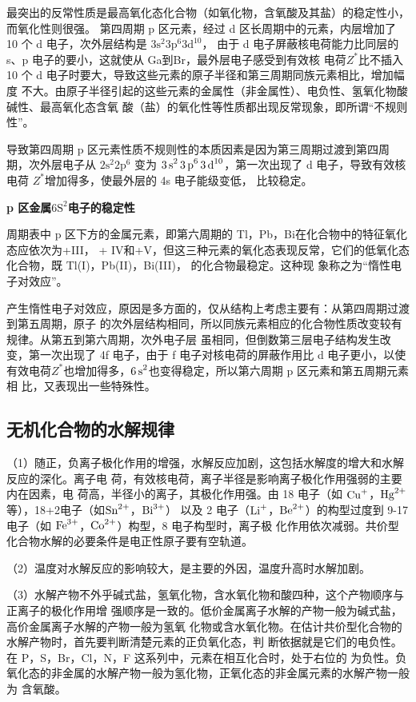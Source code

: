 \documentclass[
  10pt,
  twoside,
  openany,
  b5paper, %
  colorscheme = basic, %
  xits = false,
]{qyxf-book}
\begin{document}
最突出的反常性质是最高氧化态化合物（如氧化物，含氧酸及其盐）的稳定性小，而氧化性则很强。
第四周期 p 区元素，经过 d 区长周期中的元素，内层增加了 10 个 d 电子，次外层结构是 $\mathrm{3s^2 3p^6 3d^{10}}$，
由于 d 电子屏蔽核电荷能力比同层的 s、p 电子的要小，这就使从 Ga到Br，最外层电子感受到有效核
电荷$Z^\ast$比不插入 10 个 d 电子时要大，导致这些元素的原子半径和第三周期同族元素相比，增加幅度
不大。由原子半径引起的这些元素的金属性（非金属性）、电负性、氢氧化物酸碱性、最高氧化态含氧
酸（盐）的氧化性等性质都出现反常现象，即所谓“不规则性”。

导致第四周期 p 区元素性质不规则性的本质因素是因为第三周期过渡到第四周期，次外层电子从 $\mathrm{2s^2 2p^6}$
变为 $\ce{3s^2 3p^6 3d^{10}}$，第一次出现了 d 电子，导致有效核电荷 $Z^\ast$增加得多，使最外层的 4s 电子能级变低，
比较稳定。

\textbf{p 区金属$ \mathrm{6S^2}$电子的稳定性}

周期表中 p 区下方的金属元素，即第六周期的 Tl，Pb，Bi在化合物中的特征氧化态应依次为+III，
+ IV和+V，但这三种元素的氧化态表现反常，它们的低氧化态化合物，既 Tl(I)，Pb(II)，Bi(III)，
的化合物最稳定。这种现
象称之为“惰性电子对效应”。

产生惰性电子对效应，原因是多方面的，仅从结构上考虑主要有：从第四周期过渡到第五周期，原子
的次外层结构相同，所以同族元素相应的化合物性质改变较有规律。从第五到第六周期，次外电子层
虽相同，但倒数第三层电子结构发生改变，第一次出现了 4f 电子，由于 f 电子对核电荷的屏蔽作用比
d 电子更小，以使有效电荷$Z^\ast$也增加得多，$\ce{6s^2}$也变得稳定，所以第六周期 p 区元素和第五周期元素相
比，又表现出一些特殊性。

\subsection{无机化合物的水解规律}

（1）随正，负离子极化作用的增强，水解反应加剧，这包括水解度的增大和水解反应的深化。离子电
荷，有效核电荷，离子半径是影响离子极化作用强弱的主要内在因素，电
荷高，半径小的离子，其极化作用强。由 18 电子（如 $\ce{Cu+}$，$\ce{Hg^2+}$等），18+2电子（如$\ce{Sn^2+}$，$\ce{Bi^3+}$）
以及 2 电子（$\ce{Li+}$，$\ce{Be^2+}$）的构型过度到 9-17 电子（如 $\ce{Fe^3+}$，$\ce{Co^2+}$）构型，8 电子构型时，离子极
化作用依次减弱。共价型化合物水解的必要条件是电正性原子要有空轨道。

（2）温度对水解反应的影响较大，是主要的外因，温度升高时水解加剧。

（3）水解产物不外乎碱式盐，氢氧化物，含水氧化物和酸四种，这个产物顺序与正离子的极化作用增
强顺序是一致的。低价金属离子水解的产物一般为碱式盐，高价金属离子水解的产物一般为氢氧
化物或含水氧化物。在估计共价型化合物的水解产物时，首先要判断清楚元素的正负氧化态，判
断依据就是它们的电负性。在 P，S，Br，Cl，N，F 这系列中，元素在相互化合时，处于右位的
为负性。负氧化态的非金属的水解产物一般为氢化物，正氧化态的非金属元素的水解产物一般为
含氧酸。
\end{document}
